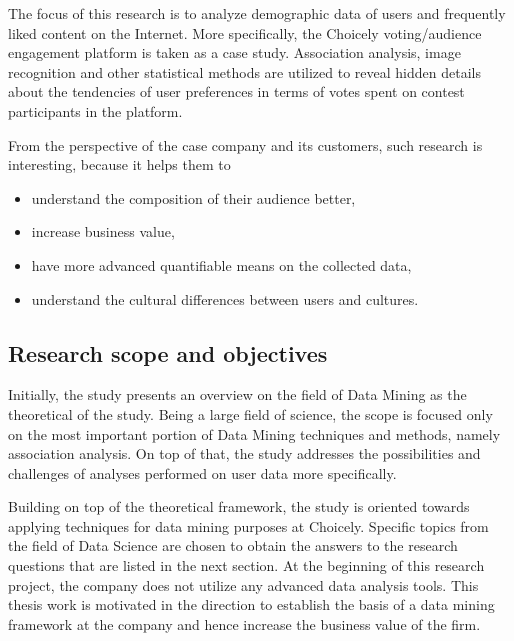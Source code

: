     The focus of this research is to analyze demographic data of users and frequently liked content on the Internet. More specifically, the Choicely voting/audience engagement platform is taken as a case study. Association analysis, image recognition and other statistical methods are utilized to reveal hidden details about the tendencies of user preferences in terms of votes spent on contest participants in the platform.   

    From the perspective of the case company and its customers, such research is interesting, because it helps them to 

    \begin{itemize}
        \item understand the composition of their audience better,
        \item increase business value,
        \item have more advanced quantifiable means on the collected data,
        \item understand the cultural differences between users and cultures. 
    \end{itemize} 

\subsection{Research scope and objectives}
    Initially, the study presents an overview on the field of Data Mining as the theoretical of the study. Being a large field of science, the scope is focused only on the most important portion of Data Mining techniques and methods, namely association analysis. On top of that, the study addresses the possibilities and challenges of analyses performed on user data more specifically.   

    Building on top of the theoretical framework, the study is oriented towards applying techniques for data mining purposes at Choicely. Specific topics from the field of Data Science are chosen to obtain the answers to the research questions that are listed in the next section. At the beginning of this research project, the company does not utilize any advanced data analysis tools. This thesis work is motivated in the direction to establish the basis of a data mining framework at the company and hence increase the business value of the firm.  


